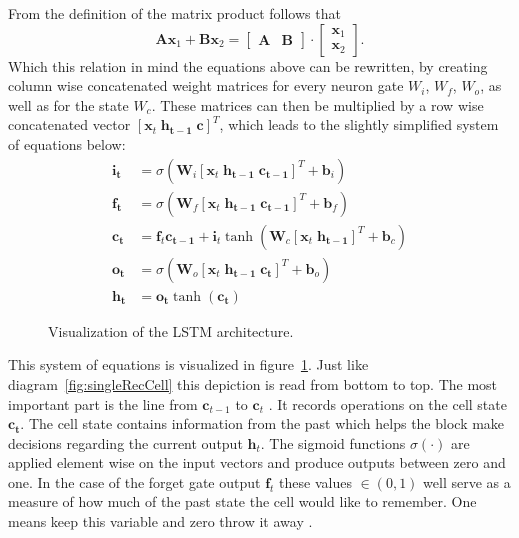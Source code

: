 From the definition of the matrix product follows that
\begin{equation}
\mathbf{A}\mathbf{x}_1 + \mathbf{B}\mathbf{x}_2
=
\begin{bmatrix} \mathbf{A} & \mathbf{B} \end{bmatrix} \cdot
\begin{bmatrix} \mathbf{x}_1 \\ \mathbf{x}_2 \end{bmatrix}.
\end{equation}
Which this relation in mind the equations above can be rewritten, by creating column wise concatenated weight matrices for every neuron gate $W_i$, $W_f$, $W_o$, as well as for the state $W_c$. These matrices can then be multiplied by a row wise concatenated vector $[\mathbf{x}_t \; \mathbf{h_{t-1}} \; \mathbf{c}]^T$, which leads to the slightly simplified system of equations below:
\begin{align}
\mathbf{i_t} &= \sigma (\mathbf{W}_i [\mathbf{x}_t \; \mathbf{h_{t-1}} \; \mathbf{c_{t-1}}]^T + \mathbf{b}_i) \\
\mathbf{f_t} &= \sigma (\mathbf{W}_f [\mathbf{x}_t \; \mathbf{h_{t-1}} \; \mathbf{c_{t-1}}]^T + \mathbf{b}_f) \\
\mathbf{c_t} &= \mathbf{f}_t \mathbf{c_{t-1}} + \mathbf{i}_t \tanh( \mathbf{W}_c [\mathbf{x}_t \; \mathbf{h_{t-1}}]^T + \mathbf{b}_c ) \\
\mathbf{o_t} &= \sigma (\mathbf{W}_o [\mathbf{x}_t \; \mathbf{h_{t-1}} \; \mathbf{c_t}]^T + \mathbf{b}_o ) \\
\mathbf{h_t} &= \mathbf{o_t} \tanh(\mathbf{c_t})
\end{align}
\begin{figure}

\caption{Visualization of the LSTM architecture.}
\label{fig:lstm}
\end{figure}
This system of equations is visualized in figure~\ref{fig:lstm}. Just like diagram~\ref{fig:singleRecCell} this depiction is read from bottom to top. The most important part is the line from $\mathbf{c}_{t-1}$ to $\mathbf{c}_{t}$ \cite{Colah2015}. It records operations on the cell state $\mathbf{c_t}$. The cell state contains information from the past which helps the block make decisions regarding the current output $\mathbf{h}_t$. The sigmoid functions $\sigma(\cdot)$ are applied element wise on the input vectors and produce outputs between zero and one. In the case of the forget gate output $\mathbf{f}_t$ these values $\in (0,1)$ well serve as a measure of how much of the past state the cell would like to remember. One means keep this variable and zero throw it away \cite{Colah2015}.
